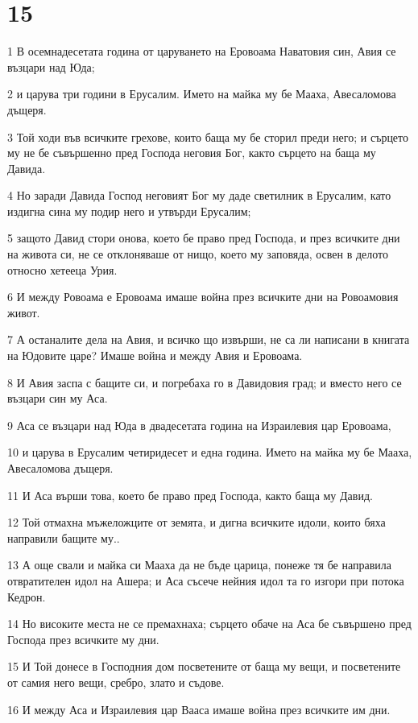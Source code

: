 \chapter{15}

\par 1 В осемнадесетата година от царуването на Еровоама Наватовия син, Авия се възцари над Юда;
\par 2 и царува три години в Ерусалим. Името на майка му бе Мааха, Авесаломова дъщеря.
\par 3 Той ходи във всичките грехове, които баща му бе сторил преди него; и сърцето му не бе съвършенно пред Господа неговия Бог, както сърцето на баща му Давида.
\par 4 Но заради Давида Господ неговият Бог му даде светилник в Ерусалим, като издигна сина му подир него и утвърди Ерусалим;
\par 5 защото Давид стори онова, което бе право пред Господа, и през всичките дни на живота си, не се отклоняваше от нищо, което му заповяда, освен в делото относно хетееца Урия.
\par 6 И между Ровоама е Еровоама имаше война през всичките дни на Ровоамовия живот.
\par 7 А останалите дела на Авия, и всичко що извърши, не са ли написани в книгата на Юдовите царе? Имаше война и между Авия и Еровоама.
\par 8 И Авия заспа с бащите си, и погребаха го в Давидовия град; и вместо него се възцари син му Аса.
\par 9 Аса се възцари над Юда в двадесетата година на Израилевия цар Еровоама,
\par 10 и царува в Ерусалим четиридесет и една година. Името на майка му бе Мааха, Авесаломова дъщеря.
\par 11 И Аса върши това, което бе право пред Господа, както баща му Давид.
\par 12 Той отмахна мъжеложците от земята, и дигна всичките идоли, които бяха направили бащите му..
\par 13 А още свали и майка си Мааха да не бъде царица, понеже тя бе направила отвратителен идол на Ашера; и Аса съсече нейния идол та го изгори при потока Кедрон.
\par 14 Но високите места не се премахнаха; сърцето обаче на Аса бе съвършено пред Господа през всичките му дни.
\par 15 И Той донесе в Господния дом посветените от баща му вещи, и посветените от самия него вещи, сребро, злато и съдове.
\par 16 И между Аса и Израилевия цар Вааса имаше война през всичките им дни.
